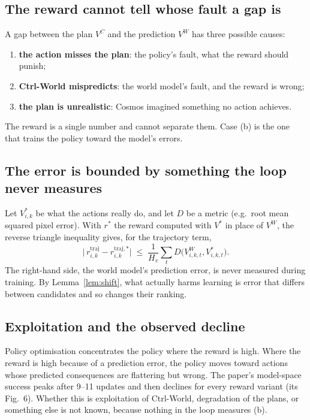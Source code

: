 \documentclass[11pt,a4paper]{article}
\theoremstyle{plain}
\theoremstyle{definition}
\theoremstyle{remark}
\newcommand{\VC}{V^{C}}
\newcommand{\VW}{V^{W}}
\begin{document}
\subsection{The reward cannot tell whose fault a gap is}
A gap between the plan $\VC$ and the prediction $\VW$ has three possible causes:
\begin{enumerate}[label=(\alph*)]
\item \textbf{the action misses the plan}: the policy's fault, what the reward should punish;
\item \textbf{Ctrl-World mispredicts}: the world model's fault, and the reward is wrong;
\item \textbf{the plan is unrealistic}: Cosmos imagined something no action achieves.
\end{enumerate}
The reward is a single number and cannot separate them. Case (b) is the one that trains the policy toward the model's errors.

\subsection{The error is bounded by something the loop never measures}
Let $V^\ast_{i,k}$ be what the actions really do, and let $D$ be a metric (e.g.\ root mean squared pixel error). With $r^{\ast}$ the reward computed with $V^\ast$ in place of $\VW$, the reverse triangle inequality gives, for the trajectory term,
\begin{equation}\label{eq:bound}
\big|\,r^{\mathrm{traj}}_{i,k}-r^{\mathrm{traj},\ast}_{i,k}\big|\;\le\;\frac{1}{H_v}\sum_{t}D\big(\VW_{i,k,t},V^\ast_{i,k,t}\big).
\end{equation}
The right-hand side, the world model's prediction error, is never measured during training. By Lemma~\ref{lem:shift}, what actually harms learning is error that differs between candidates and so changes their ranking.

\subsection{Exploitation and the observed decline}
Policy optimisation concentrates the policy where the reward is high. Where the reward is high because of a prediction error, the policy moves toward actions whose predicted consequences are flattering but wrong. The paper's model-space success peaks after 9--11 updates and then declines for every reward variant (its Fig.~6). Whether this is exploitation of Ctrl-World, degradation of the plans, or something else is not known, because nothing in the loop measures (b).
\end{document}
